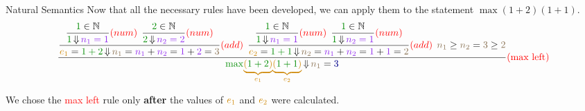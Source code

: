 \begin{example}[Lecture 3]{Natural Semantics}
  Now that all the necessary rules have been developed, we can apply them to the statement $\max (1+2) (1+1)$.
  \begin{equation*}
    \dfrac{
      \dfrac{
        \dfrac{\textcolor{Green4}{1} \in \NaturalNumbers}{\textcolor{Green4}{1} \EvaluatesTo \textcolor{Purple2}{n_{1} = 1}} \textcolor{red}{(num)} \:\:
        \dfrac{\textcolor{Green4}{2} \in \NaturalNumbers}{\textcolor{Green4}{2} \EvaluatesTo \textcolor{Purple2}{n_{2} = 2}} \textcolor{red}{(num)}}
      {\textcolor{Orange3}{e_{1}} = \textcolor{Green4}{1+2} \EvaluatesTo \textcolor{Burlywood4}{n_{1}} = \textcolor{Purple2}{n_{1}} + \textcolor{Purple2}{n_{2}} = \textcolor{Purple2}{1}+\textcolor{Purple2}{2}=\textcolor{Burlywood4}{3}} \textcolor{red}{(add)} \:\:
      \dfrac{
        \dfrac{\textcolor{Green4}{1} \in \NaturalNumbers}{\textcolor{Green4}{1} \EvaluatesTo \textcolor{Purple2}{n_{1} = 1}} \textcolor{red}{(num)} \:\:
        \dfrac{\textcolor{Green4}{1} \in \NaturalNumbers}{\textcolor{Green4}{1} \EvaluatesTo \textcolor{Purple2}{n_{2} = 1}} \textcolor{red}{(num)}}
      {\textcolor{Orange3}{e_{2}} = \textcolor{Green4}{1+1} \EvaluatesTo \textcolor{Burlywood4}{n_{2}} = \textcolor{Purple2}{n_{1}} + \textcolor{Purple2}{n_{2}} = \textcolor{Purple2}{1}+\textcolor{Purple2}{1} = \textcolor{Burlywood4}{2}} \textcolor{red}{(add)} \:\:
      \textcolor{Burlywood4}{n_{1}} \geq \textcolor{Burlywood4}{n_{2}} = \textcolor{Burlywood4}{3} \geq \textcolor{Burlywood4}{2}}
    {\textcolor{Green4}{\mathtt{\max}} \textcolor{Orange3}{\underbrace{(\textcolor{Green4}{1+2}\textcolor{Orange3}{)}}_{\textcolor{Orange3}{e_{1}}}} \textcolor{Orange3}{\underbrace{\textcolor{Orange3}{(\textcolor{Green4}{1+1}\textcolor{Orange3}{)}}}_{\textcolor{Orange3}{e_{2}}}} \EvaluatesTo \textcolor{Burlywood4}{n_{1}} = \textcolor{Blue4}{3}} \textcolor{red}{(\text{max left})}
  \end{equation*}

  We chose the \textcolor{red}{max left} rule only \textbf{after} the values of $\textcolor{Orange3}{e_{1}}$ and $\textcolor{Orange3}{e_{2}}$ were calculated.
\end{example}

